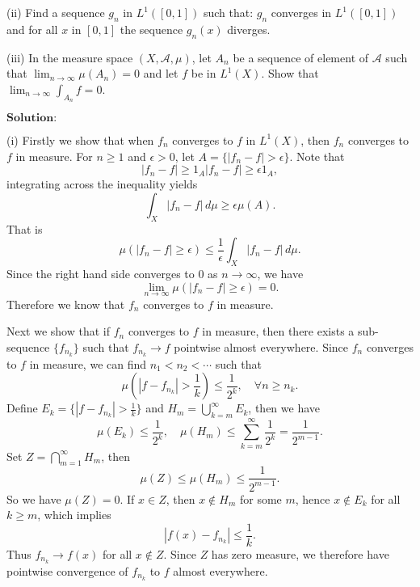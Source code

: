 \documentclass[12pt]{article}
\begin{document}
(ii) Find a sequence $g_{n}$ in $L^{1}([0, 1])$ such that: $g_{n}$ converges in $L^{1}([0, 1])$ and for all $x$ in $[0, 1]$ the sequence $g_{n}(x)$ diverges.
\vspace{8pt}

(iii) In the measure space $(X, \mathcal{A}, \mu)$, let $A_{n}$ be a sequence of element of $\mathcal{A}$ such that $\lim_{n \to \infty} \mu(A_{n}) = 0$ and let $f$ be in $L^{1}(X)$. Show that $\lim_{n \to \infty} \int_{A_{n}} f = 0$. 

\vspace{8pt}

$\textbf{Solution:}$

(i) Firstly we show that when $f_{n}$ converges to $f$ in $L^{1}(X)$, then $f_{n}$ converges to $f$ in measure. For $n \geq 1$ and $\epsilon > 0$, let $A = \{|f_{n} - f| > \epsilon \}$. Note that
\begin{equation*}
    |f_{n} - f| \geq 1_{A}  |f_{n} - f| \geq \epsilon 1_{A},
\end{equation*}
integrating across the inequality yields
\begin{equation*}
    \int_{X} |f_{n} - f| \, d \mu \geq \epsilon \mu(A) .
\end{equation*}
That is
\begin{equation*}
    \mu(|f_{n} - f| \geq \epsilon) \leq \frac{1}{\epsilon} \int_{X} |f_{n} - f| \, d \mu.
\end{equation*}
Since the right hand side converges to $0$ as $n \to \infty$, we have
\begin{equation*}
    \lim_{n \to \infty} \mu(|f_{n} - f| \geq \epsilon) = 0.
\end{equation*}
Therefore we know that $f_{n}$ converges to $f$ in measure. 

Next we show that if $f_{n}$ converges to $f$ in measure, then there exists a sub-sequence $\{f_{n_{k}}\}$ such that $f_{n_{k}} \to f$ pointwise almost everywhere. Since $f_{n}$ converges to $f$ in measure, we can find $n_{1} < n_{2} < \cdots$ such that 
\begin{equation*}
    \mu(|f - f_{n_{k}}| > \frac{1}{k}) \leq \frac{1}{2^{k}}, \quad \forall n \geq n_{k}.
\end{equation*}
Define $E_{k} = \{|f - f_{n_{k}}| > \frac{1}{k}\}$ and $H_{m} = \bigcup_{k = m}^{\infty} E_{k}$, then we have
\begin{equation*}
    \mu(E_{k}) \leq \frac{1}{2^{k}}, \quad \mu(H_{m}) \leq \sum_{k = m}^{\infty} \frac{1}{2^{k}} = \frac{1}{2^{m-1}}.
\end{equation*}
Set $Z = \bigcap_{m = 1}^{\infty} H_{m}$, then
\begin{equation*}
    \mu(Z) \leq \mu(H_{m}) \leq \frac{1}{2^{m-1}}.
\end{equation*}
So we have $\mu(Z) = 0$. If $x \in Z$, then $x \notin H_{m}$ for some $m$, hence $x \notin E_{k}$ for all $k \geq m$, which implies
\begin{equation*}
    |f(x) - f_{n_{k}}| \leq \frac{1}{k}.
\end{equation*}
Thus $f_{n_{k}} \to f(x)$ for all $x \notin Z$. Since $Z$ has zero measure, we therefore have pointwise convergence of $f_{n_{k}}$ to $f$ almost everywhere. 
\end{document}
